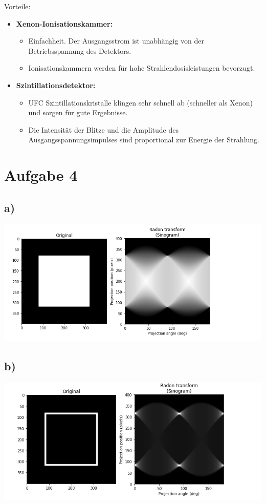 Vorteile:
\begin{itemize}
    \item \textbf{Xenon-Ionisationskammer: }
    \begin{itemize}
    \item Einfachheit. Der Ausgangsstrom ist unabhängig von der Betriebsspannung des Detektors.
    \item Ionisationskammern werden für hohe Strahlendosisleistungen bevorzugt. 
    \end{itemize}
    \item \textbf{Szintillationsdetektor: } \begin{itemize} 
    \item  UFC Szintillationskristalle klingen sehr schnell ab (schneller als Xenon) und sorgen für gute Ergebnisse.
    \item Die Intensität der Blitze und die Amplitude des Ausgangsspannungsimpulses sind proportional zur Energie der Strahlung. 

    \end{itemize}
\end{itemize}


\section{Aufgabe 4}

\subsection*{a)}

\includegraphics[width=1\textwidth]{figures/a.PNG}

\subsection*{b)}

\includegraphics[width=1\textwidth]{figures/b.PNG}